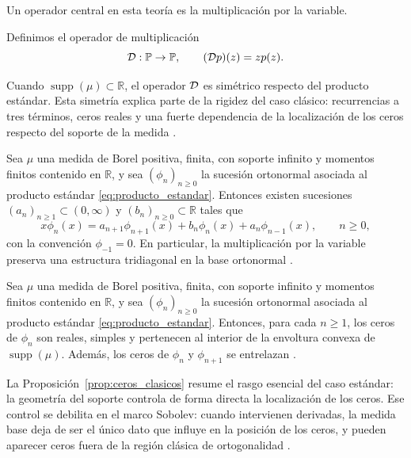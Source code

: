 Un operador central en esta teoría es la multiplicación por la variable.

\begin{defn}\label{def:operador_multiplicacion_intro}
	Definimos el operador de multiplicación
	\[
		\mathcal{D}:\mathbb{P}\to\mathbb{P},
		\qquad
		(\mathcal{D} p)(z)=zp(z).
	\]
\end{defn}

Cuando \(\operatorname{supp}(\mu)\subset\mathbb R\), el operador \(\mathcal{D}\) es
simétrico respecto del producto estándar. Esta simetría explica parte de la
rigidez del caso clásico: recurrencias a tres términos, ceros reales y una fuerte
dependencia de la localización de los ceros respecto del soporte de la medida
\cite{Chi78,szego1975orthogonal}.

\begin{prop}
	\label{prop:recurrencia_tres_terminos_intro}
	Sea \(\mu\) una medida de Borel positiva, finita, con soporte infinito y momentos finitos contenido
	en \(\mathbb R\), y sea \((\phi_n)_{n\ge 0}\) la sucesión ortonormal asociada al
	producto estándar \eqref{eq:producto_estandar}. Entonces existen sucesiones
	\((a_n)_{n\ge 1}\subset(0,\infty)\) y \((b_n)_{n\ge 0}\subset\mathbb R\) tales
	que
	\[
		x\phi_n(x)=a_{n+1}\phi_{n+1}(x)+b_n\phi_n(x)+a_n\phi_{n-1}(x),
		\qquad n\ge 0,
	\]
	con la convención \(\phi_{-1}=0\). En particular, la multiplicación por la
	variable preserva una estructura tridiagonal en la base ortonormal
	\cite{Chi78,szego1975orthogonal}.
\end{prop}

\begin{prop}\label{prop:ceros_clasicos}
	Sea \(\mu\) una medida de Borel positiva, finita, con soporte infinito y momentos finitos contenido
	en \(\mathbb R\), y sea \((\phi_n)_{n\ge 0}\) la sucesión ortonormal asociada al
	producto estándar \eqref{eq:producto_estandar}. Entonces, para cada \(n\ge 1\),
	los ceros de \(\phi_n\) son reales, simples y pertenecen al interior de la
	envoltura convexa de \(\operatorname{supp}(\mu)\). Además, los ceros de
	\(\phi_n\) y \(\phi_{n+1}\) se entrelazan \cite{Chi78,szego1975orthogonal}.
\end{prop}

La Proposición~\ref{prop:ceros_clasicos} resume el rasgo esencial del caso
estándar: la geometría del soporte controla de forma directa la localización de
los ceros. Ese control se debilita en el marco Sobolev: cuando intervienen
derivadas, la medida base deja de ser el único dato que influye en la posición de
los ceros, y pueden aparecer ceros fuera de la región clásica de ortogonalidad
\cite{Alt62,AlfRez01,marcellan2015sobolev}.

